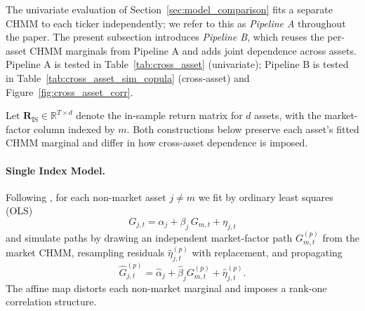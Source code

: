 The univariate evaluation of Section~\ref{sec:model_comparison} fits a separate CHMM to each ticker independently; we refer to this as \emph{Pipeline A} throughout the paper. The present subsection introduces \emph{Pipeline B}, which reuses the per-asset CHMM marginals from Pipeline A and adds joint dependence across assets. Pipeline A is tested in Table~\ref{tab:cross_asset} (univariate); Pipeline B is tested in Table~\ref{tab:cross_asset_sim_copula} (cross-asset) and Figure~\ref{fig:cross_asset_corr}.

Let $\mathbf{R}_{\text{IS}} \in \mathbb{R}^{T \times d}$ denote the in-sample return matrix for $d$ assets, with the market-factor column indexed by $m$.
Both constructions below preserve each asset's fitted CHMM marginal and differ in how cross-asset dependence is imposed.

\paragraph{Single Index Model.}
Following \citet{sharpe1963simplified}, for each non-market asset $j \neq m$ we fit by ordinary least squares (OLS)
\begin{equation}
    G_{j,t} = \alpha_j + \beta_j\, G_{m,t} + \eta_{j,t}
    \label{eq:sim}
\end{equation}
and simulate paths by drawing an independent market-factor path $G_{m,t}^{(p)}$ from the market CHMM, resampling residuals $\hat{\eta}_{j,t}^{(p)}$ with replacement, and propagating
\begin{equation}
    \hat{G}_{j,t}^{(p)} = \hat\alpha_j + \hat\beta_j G_{m,t}^{(p)} + \hat\eta_{j,t}^{(p)}.
    \label{eq:sim_sim}
\end{equation}
The affine map distorts each non-market marginal and imposes a rank-one correlation structure.

